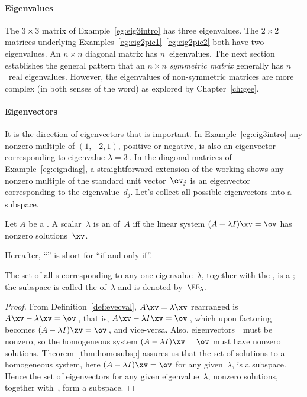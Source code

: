 \paragraph{Eigenvalues}
The \(3\times 3\) matrix of Example~\ref{eg:eig3intro} has three eigenvalues.
The \(2\times2\) matrices underlying Examples~\ref{eg:eig2pic1}--\ref{eg:eig2pic2} both have two eigenvalues.
An \(n\times n\) diagonal matrix has \(n\)~eigenvalues.
The next section establishes the general pattern that an \(n\times n\) \emph{symmetric matrix} generally has \(n\)~real eigenvalues.
However, the eigenvalues of non-symmetric matrices are more complex (in both senses of the word) as explored by Chapter~\ref{ch:gee}.

\paragraph{Eigenvectors}
It is the direction of eigenvectors that is important.
In Example~\ref{eg:eig3intro} any nonzero multiple of \((1,-2,1)\), positive or negative, is also an eigenvector corresponding to eigenvalue \(\lambda=3\)\,.
In the diagonal matrices of Example~\ref{eg:eigndiag}, a straightforward extension of the working shows any nonzero multiple of the standard unit vector~\(\ev_j\) is an eigenvector corresponding to the eigenvalue~\(d_j\).
Let's collect all possible eigenvectors into a subspace. 


\begin{theorem} \label{thm:espacedef} 
Let \(A\) be a . 
A scalar~\(\lambda\) is an  of~\(A\) iff the  linear system \((A-\lambda I)\xv=\ov\) has nonzero solutions~\(\xv\).  
\begin{aside}
Hereafter, ``'' is short for ``if and only if''.
\end{aside}%
The set of all s corresponding to any one eigenvalue~\(\lambda\), together with the , is a ; the subspace is called the  of~\(\lambda\) and is denoted by~\(\EE_\lambda\).
\end{theorem}



\begin{proof} 
From Definition~\ref{def:evecval},  \(A\xv=\lambda\xv\)  rearranged is \(A\xv-\lambda\xv=\ov\)\,, that is, \(A\xv-\lambda I\xv=\ov\)\,, which upon factoring becomes \((A-\lambda I)\xv=\ov\)\,, and vice-versa.  
Also, eigenvectors~\xv\ must be nonzero, so the homogeneous system \((A-\lambda I)\xv=\ov\) must have nonzero solutions.
Theorem~\ref{thm:homosubsp} assures us that the set of solutions to a homogeneous system, here \((A-\lambda I)\xv=\ov\) for any given~\(\lambda\), is a subspace. 
Hence the set of eigenvectors for any given eigenvalue~\(\lambda\), nonzero solutions, together with~\ov, form a subspace.
\end{proof}



